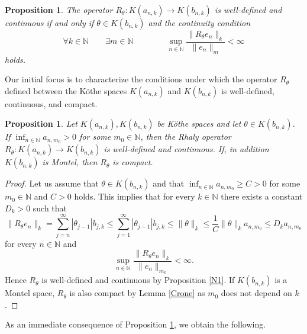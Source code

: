 \documentclass{birkjour}
\newtheorem{prop}[thm]{Proposition}
\theoremstyle{definition}
\theoremstyle{remark}
\numberwithin{equation}{section}
\begin{document}
\begin{prop}\label{RP1} The operator $R_{\theta}:K(a_{n,k})\to K(b_{n,k})$ is well-defined and continuous if and only if $\theta\in K(b_{n,k})$ and the continuity condition 
\[\forall k\in \mathbb{N} \quad\quad \exists m\in \mathbb{N} \quad\quad\quad\quad \sup_{n\in \mathbb{N}}\frac{ \|R_{\theta}e_{n}\|_{k}}{\|e_{n}\|_{m}}<\infty \]
holds.
\end{prop}

Our initial focus is to characterize the conditions under which the operator $R_{\theta}$ defined between the Köthe spaces $K(a_{n,k})$ and $K(b_{n,k})$ is well-defined, continuous, and compact.


\begin{prop}\label{P2} Let $K(a_{n,k}), K(b_{n,k})
$ be  Köthe spaces and let $\theta\in K(b_{n,k})$. If $\displaystyle \inf_{n\in \mathbb{N}} a_{n,m_{0}}>0$ for some $m_{0}\in\mathbb{N}$, then the Rhaly operator $R_{\theta}:K(a_{n,k}) \to K(b_{n,k})$ is well-defined and continuous. If, in addition $K(b_{n,k})$ is Montel, then $R_{\theta}$ is compact.
\end{prop}
\begin{proof} Let us assume that $\theta\in K(b_{n,k})$ and that $\displaystyle \inf_{n\in \mathbb{N}} a_{n,m_{0}}\geq C>0$ for some $m_{0}\in\mathbb{N}$ and $C>0$ holds.  This implies that for every $k\in \mathbb{N}$ there exists a constant $D_{k}>0$ such that
\begin{equation*}
\|R_{\theta}e_{n}\|_{k}=\sum^{\infty}_{j=n}|\theta_{j-1}|b_{j,k}\leq \sum^{\infty}_{j=1}|\theta_{j-1}|b_{j,k} \leq \|\theta\|_{k}\leq \frac{1}{ C}\|\theta\|_{k}a_{n,m_{0}}\leq D_{k} a_{n,m_{0}}
\end{equation*}
for every $n\in \mathbb{N}$ and 
$$\sup_{n\in \mathbb{N}} \frac{\|R_{\theta}e_{n}\|_{k}}{\|e_{n}\|_{m_{0}}}<\infty.$$
Hence $R_{\theta}$ is well-defined and continuous by Proposition \ref{N1}. If $K(b_{n,k})$ is a Montel space, $R_{\theta}$ is also compact by Lemma \ref{Crone} as $m_{0}$ does not depend on $k$.
\end{proof}


As an immediate consequence of Proposition \ref{P2}, we obtain the following.
\end{document}
